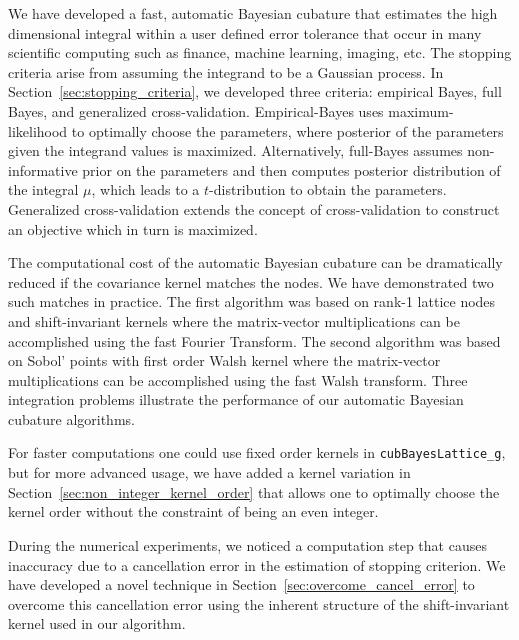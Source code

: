 \documentclass{iitthesis}          %
\newcommand{\code}[1]{\texttt{#1}}
\newcommand\secref{Section~\ref}
\begin{document}
{{{{{{\fi








We have developed a fast, automatic Bayesian cubature that estimates the high dimensional integral within a user defined error tolerance  that occur in many scientific computing such as finance, machine learning, imaging, etc.  The stopping criteria arise from assuming the integrand to be a Gaussian process.  In \secref{sec:stopping_criteria}, we developed three criteria:  empirical Bayes, full Bayes, and generalized cross-validation.  Empirical-Bayes uses maximum-likelihood to optimally choose the parameters, where posterior of the parameters given the integrand values is maximized. Alternatively, full-Bayes assumes non-informative prior on the parameters and then computes posterior distribution of the integral $\mu$, which leads to a $t$-distribution to obtain the parameters. Generalized cross-validation extends the concept of cross-validation to construct an objective which in turn is maximized.

The computational cost of the automatic Bayesian cubature can be dramatically reduced if the covariance kernel matches the nodes.  We have demonstrated two such matches in practice. The first algorithm was based on rank-1 lattice nodes and shift-invariant kernels where the matrix-vector multiplications can be accomplished using the fast Fourier Transform.  The second algorithm was based on Sobol' points with first order Walsh kernel where the matrix-vector multiplications can be accomplished using the fast Walsh transform. Three integration problems illustrate the performance of our automatic Bayesian cubature algorithms.  

For faster computations one could use fixed order kernels in \code{cubBayesLattice\_g}, but for more advanced usage, we have added a kernel variation in \secref{sec:non_integer_kernel_order} that allows one to optimally choose the kernel order without the constraint of being an even integer.

During the numerical experiments, we noticed a computation step that causes inaccuracy due to a cancellation error in the estimation of stopping criterion.
We have developed a novel technique in \secref{sec:overcome_cancel_error} to overcome this cancellation error using the inherent structure of the shift-invariant kernel used in our algorithm.

}}}}}}
\end{document}
